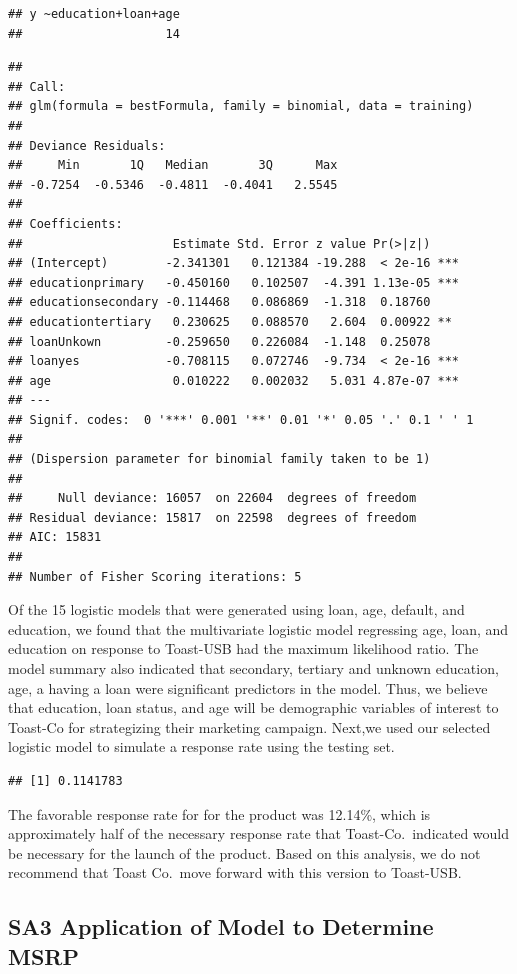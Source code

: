 \documentclass[]{article}
\begin{document}
\begin{verbatim}
## y ~education+loan+age 
##                    14
\end{verbatim}

\begin{verbatim}
## 
## Call:
## glm(formula = bestFormula, family = binomial, data = training)
## 
## Deviance Residuals: 
##     Min       1Q   Median       3Q      Max  
## -0.7254  -0.5346  -0.4811  -0.4041   2.5545  
## 
## Coefficients:
##                     Estimate Std. Error z value Pr(>|z|)    
## (Intercept)        -2.341301   0.121384 -19.288  < 2e-16 ***
## educationprimary   -0.450160   0.102507  -4.391 1.13e-05 ***
## educationsecondary -0.114468   0.086869  -1.318  0.18760    
## educationtertiary   0.230625   0.088570   2.604  0.00922 ** 
## loanUnkown         -0.259650   0.226084  -1.148  0.25078    
## loanyes            -0.708115   0.072746  -9.734  < 2e-16 ***
## age                 0.010222   0.002032   5.031 4.87e-07 ***
## ---
## Signif. codes:  0 '***' 0.001 '**' 0.01 '*' 0.05 '.' 0.1 ' ' 1
## 
## (Dispersion parameter for binomial family taken to be 1)
## 
##     Null deviance: 16057  on 22604  degrees of freedom
## Residual deviance: 15817  on 22598  degrees of freedom
## AIC: 15831
## 
## Number of Fisher Scoring iterations: 5
\end{verbatim}

Of the 15 logistic models that were generated using loan, age, default,
and education, we found that the multivariate logistic model regressing
age, loan, and education on response to Toast-USB had the maximum
likelihood ratio. The model summary also indicated that secondary,
tertiary and unknown education, age, a having a loan were significant
predictors in the model. Thus, we believe that education, loan status,
and age will be demographic variables of interest to Toast-Co for
strategizing their marketing campaign. Next,we used our selected
logistic model to simulate a response rate using the testing set.

\begin{verbatim}
## [1] 0.1141783
\end{verbatim}

The favorable response rate for for the product was 12.14\%, which is
approximately half of the necessary response rate that
Toast-Co.~indicated would be necessary for the launch of the product.
Based on this analysis, we do not recommend that Toast Co.~move forward
with this version to Toast-USB.

\hypertarget{sa3-application-of-model-to-determine-msrp}{%
\subsection{SA3 Application of Model to Determine
MSRP}\label{sa3-application-of-model-to-determine-msrp}}
\end{document}
